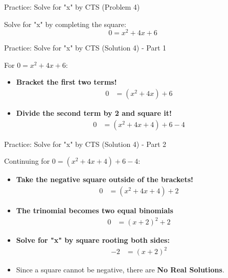\documentclass[aspectratio=169]{beamer}
\begin{document}
\begin{frame}{Practice: Solve for "x" by CTS (Problem 4)}
    \begin{tcolorbox}[colback=lightgray,colframe=primary,title=Problem 4]
        \footnotesize
        Solve for "x" by completing the square:
        \[ 0 = x^2 + 4x + 6 \]
    \end{tcolorbox}
\end{frame}

\begin{frame}{Practice: Solve for "x" by CTS (Solution 4) - Part 1}
    \begin{tcolorbox}[colback=lightgray,colframe=accent,title=Solution 4 - Part 1]
        \footnotesize
        For $0 = x^2 + 4x + 6$:
        \begin{itemize}
            \item \textbf{Bracket the first two terms!}
                \begin{align*}
                    0 &= (x^2 + 4x) + 6
                \end{align*}
            \item \textbf{Divide the second term by 2 and square it!}
                \begin{align*}
                    0 &= (x^2 + 4x + 4) + 6 - 4
                \end{align*}
        \end{itemize}
    \end{tcolorbox}
\end{frame}

\begin{frame}{Practice: Solve for "x" by CTS (Solution 4) - Part 2}
    \begin{tcolorbox}[colback=lightgray,colframe=accent,title=Solution 4 - Part 2 (Cont.)]
        \footnotesize
        Continuing for $0 = (x^2 + 4x + 4) + 6 - 4$:
        \begin{itemize}
            \item \textbf{Take the negative square outside of the brackets!}
                \begin{align*}
                    0 &= (x^2 + 4x + 4) + 2
                \end{align*}
            \item \textbf{The trinomial becomes two equal binomials}
                \begin{align*}
                    0 &= (x+2)^2 + 2
                \end{align*}
            \item \textbf{Solve for "x" by square rooting both sides:}
                \begin{align*}
                    -2 &= (x+2)^2
                \end{align*}
            \item Since a square cannot be negative, there are \textbf{No Real Solutions}.
        \end{itemize}
    \end{tcolorbox}
\end{frame}
\end{document}

